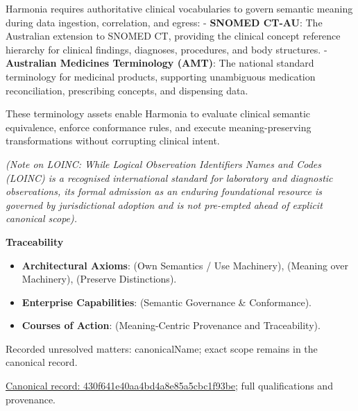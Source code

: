 Harmonia requires authoritative clinical vocabularies to govern semantic meaning during data ingestion, correlation, and egress:
- \textbf{SNOMED CT-AU}: The Australian extension to SNOMED CT, providing the clinical concept reference hierarchy for clinical findings, diagnoses, procedures, and body structures.
- \textbf{Australian Medicines Terminology (AMT)}: The national standard terminology for medicinal products, supporting unambiguous medication reconciliation, prescribing concepts, and dispensing data.



These terminology assets enable Harmonia to evaluate clinical semantic equivalence, enforce conformance rules, and execute meaning-preserving transformations without corrupting clinical intent.



\emph{(Note on LOINC: While Logical Observation Identifiers Names and Codes (LOINC) is a recognised international standard for laboratory and diagnostic observations, its formal admission as an enduring foundational resource is governed by jurisdictional adoption and is not pre-empted ahead of explicit canonical scope).}



\par\medskip\textbf{Traceability}\par


\begin{itemize}


\item \textbf{Architectural Axioms}: \texttt{} (Own Semantics / Use Machinery), \texttt{} (Meaning over Machinery), \texttt{} (Preserve Distinctions).

\item \textbf{Enterprise Capabilities}: \texttt{} (Semantic Governance \& Conformance).

\item \textbf{Courses of Action}: \texttt{} (Meaning-Centric Provenance and Traceability).

\end{itemize}

{\small Recorded unresolved matters: canonicalName; exact scope remains in the canonical record.}\par
{\footnotesize \href{../../../../../../../continuum/strategy/resource/430f641e40aa4bd4a8e85a5cbc1f93be.md}{Canonical record: 430f641e40aa4bd4a8e85a5cbc1f93be}; full qualifications and provenance.}\par
